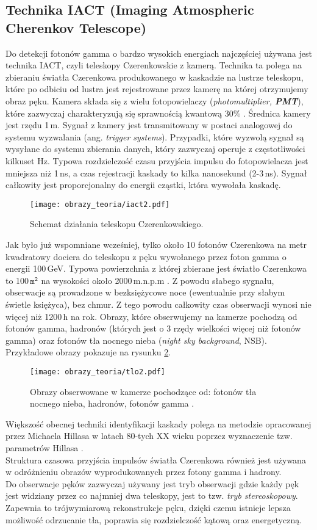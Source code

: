 \documentclass[a4paper,11pt,twoside]{article}
\begin{document}
\subsection{Technika IACT (Imaging Atmospheric Cherenkov Telescope)}
Do detekcji fotonów gamma o bardzo wysokich energiach najczęściej używana jest technika IACT, czyli teleskopy Czerenkowskie z kamerą. Technika ta polega na zbieraniu światła Czerenkowa produkowanego w kaskadzie na lustrze teleskopu, które po odbiciu od lustra jest rejestrowane przez kamerę na której otrzymujemy obraz pęku. Kamera składa się z wielu fotopowielaczy (\textsl{photomultiplier, {\bf{PMT}}}), które zazwyczaj charakteryzują się sprawnością kwantową 30\% \cite{particle_de_angelis}. Średnica kamery jest rzędu 1\,m. Sygnał z kamery jest transmitowany w postaci analogowej do systemu wyzwalania (ang. \textsl{trigger systems}). Przypadki, które wyzwolą sygnał są wysyłane do systemu zbierania danych, który zazwyczaj operuje z częstotliwości kilkuset Hz. Typowa rozdzielczość czasu przyjścia impulsu do fotopowielacza jest mniejsza niż 1\,ns, a czas rejestracji kaskady to kilka nanosekund (2-3\,ns). Sygnał całkowity jest proporcjonalny do energii cząstki, która wywołała kaskadę.
\begin{figure}[H] 
\centering
\texttt{[image: obrazy\_teoria/iact2.pdf]}
\caption{Schemat działania teleskopu Czerenkowskiego.}
\label{fig:kamera}
\end{figure}
Jak było już wspomniane wcześniej, tylko około 10 fotonów Czerenkowa na metr kwadratowy dociera do teleskopu z pęku wywołanego przez foton gamma o energii 100\,GeV. Typowa powierzchnia z której zbierane jest światło Czerenkowa to 100\,$\mathtt{m^2}$ na wysokości około 2000\,m.n.p.m \cite{particle_de_angelis}. Z powodu słabego sygnału, obserwacje są prowadzone w bezksiężycowe noce (ewentualnie przy słabym świetle księżyca), bez chmur. Z tego powodu całkowity czas obserwacji wynosi nie więcej niż 1200\,h na rok.
Obrazy, które obserwujemy na kamerze pochodzą od fotonów gamma, hadronów (których jest o 3 rzędy wielkości więcej niż fotonów gamma) oraz fotonów tła nocnego nieba (\textsl{night sky background}, NSB). Przykładowe obrazy pokazuje na rysunku
 \ref{fig:kamera}.
\begin{figure}[H] 
\centering
\texttt{[image: obrazy\_teoria/tlo2.pdf]}
\caption{Obrazy obserwowane w kamerze pochodzące od: fotonów tła nocnego nieba, hadronów, fotonów gamma \cite{cta_de_angelis}. }
\label{fig:kamera}
\end{figure}
Większość obecnej techniki identyfikacji kaskady polega na metodzie opracowanej przez Michaela Hillasa w latach 80-tych XX wieku poprzez wyznaczenie tzw. parametrów Hillasa \cite{hilas}. \\
Struktura czasowa przyjścia impulsów światła Czerenkowa również jest używana w odróżnieniu obrazów wyprodukowanych przez fotony gamma i hadrony. \\
Do obserwacje pęków zazwyczaj używany jest tryb obserwacji gdzie każdy pęk jest widziany przez co najmniej dwa teleskopy, jest to tzw. \textsl{tryb stereoskopowy}. Zapewnia to trójwymiarową rekonstrukcje pęku, dzięki czemu istnieje lepsza możliwość odrzucanie tła, poprawia się rozdzielczość kątową oraz energetyczną.
\end{document}
